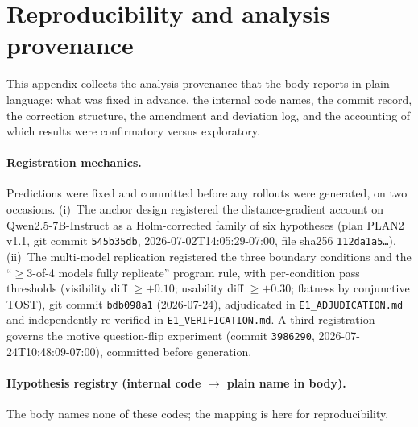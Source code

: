 \section{Reproducibility and analysis provenance}
\label{app:provenance}


This appendix collects the analysis provenance that the body reports in
plain language: what was fixed in advance, the internal code names, the
commit record, the correction structure, the amendment and deviation log,
and the accounting of which results were confirmatory versus exploratory.

\paragraph{Registration mechanics.} Predictions were fixed and committed
before any rollouts were generated, on two occasions. (i)~The anchor design
registered the distance-gradient account on Qwen2.5-7B-Instruct as a
Holm-corrected family of six hypotheses (plan PLAN2 v1.1, git commit
\texttt{545b35db}, 2026-07-02T14:05:29-07:00, file sha256
\texttt{112da1a5\dots}). (ii)~The multi-model replication registered the
three boundary conditions and the ``$\ge$3-of-4 models fully replicate''
program rule, with per-condition pass thresholds (visibility diff
$\ge{+}0.10$; usability diff $\ge{+}0.30$; flatness by conjunctive TOST),
git commit \texttt{bdb098a1} (2026-07-24), adjudicated in
\texttt{E1\_ADJUDICATION.md} and independently re-verified in
\texttt{E1\_VERIFICATION.md}. A third registration governs the motive
question-flip experiment (commit \texttt{3986290}, 2026-07-24T10:48:09-07:00),
committed before generation.

\paragraph{Hypothesis registry (internal code $\rightarrow$ plain name in
body).} The body names none of these codes; the mapping is here for
reproducibility.

